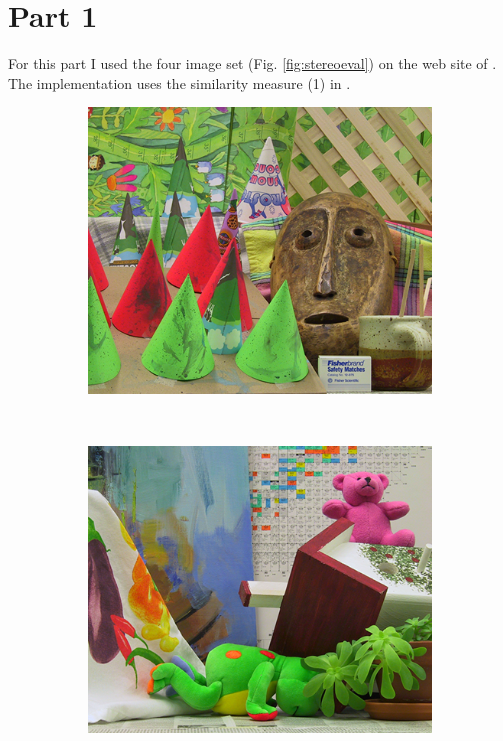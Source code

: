 \documentclass[letterpaper,12pt]{article}
\begin{document}
\pagestyle{fancy}

\section{Part 1}
\label{section:p1}
	For this part I used the four image set (Fig. \ref{fig:stereoeval}) on the web site of \cite{scharstein2002taxonomy}. The implementation uses the similarity measure (1) in \cite{fua1993parallel}.

\begin{figure}
        \centering
        \begin{subfigure}[b]{0.2\textwidth}
                \includegraphics[width=\textwidth]{conesL.png}
                \label{fig:cones}
        \end{subfigure}%
        \quad
        ~ %
        \begin{subfigure}[b]{0.2\textwidth}
                \includegraphics[width=\textwidth]{teddyL.png}

\end{subfigure}
\end{figure}
\end{document}
